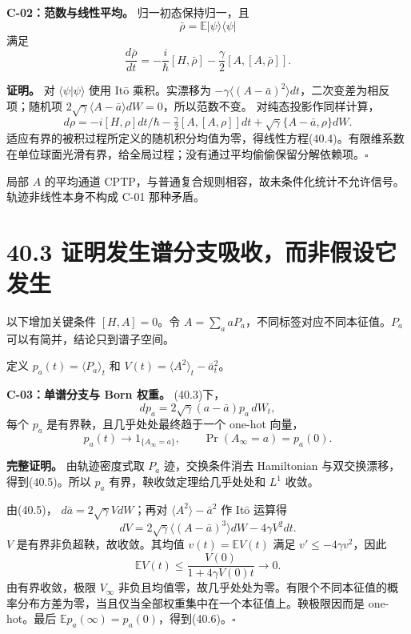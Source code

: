 \documentclass[
  11pt,
  oneside]{book}
\begin{document}
\protect\hypertarget{c-02}{}{}

\textbf{C-02：范数与线性平均。} 归一初态保持归一，且 \[
\bar\rho=\mathbb E|\psi\rangle\langle\psi|
\] 满足 \[
\frac{d\bar\rho}{dt}
=-\frac{i}{\hbar}[H,\bar\rho]
-\frac{\gamma}{2}[A,[A,\bar\rho]].
\tag{40.4}
\]

\textbf{证明。} 对 \(\langle\psi|\psi\rangle\) 使用 Itō 乘积。实漂移为
\(-\gamma\langle(A-\bar a)^2\rangle dt\)，二次变差为相反项；随机项
\(2\sqrt\gamma\langle A-\bar a\rangle dW=0\)，所以范数不变。
对纯态投影作同样计算， \[
d\rho=-i[H,\rho]dt/\hbar-\tfrac\gamma2[A,[A,\rho]]dt
+\sqrt\gamma\{A-\bar a,\rho\}dW.
\]
适应有界的被积过程所定义的随机积分均值为零，得线性方程(40.4)。有限维系数在单位球面光滑有界，给全局过程；没有通过平均偷偷保留分解依赖项。\(\square\)

局部 \(A\) 的平均通道
CPTP，与普通复合规则相容，故未条件化统计不允许信号。轨迹非线性本身不构成
C-01 那种矛盾。

\section{40.3 证明发生谱分支吸收，而非假设它发生}

以下增加关键条件 \([H,A]=0\)。令
\(A=\sum_a aP_a\)，不同标签对应不同本征值。\(P_a\)
可以有简并，结论只到谱子空间。

定义 \(p_a(t)=\langle P_a\rangle_t\) 和
\(V(t)=\langle A^2\rangle_t-\bar a_t^2\)。

\protect\hypertarget{c-03}{}{}

\textbf{C-03：单谱分支与 Born 权重。} (40.3)下， \[
dp_a=2\sqrt\gamma(a-\bar a)p_a\,dW_t,
\tag{40.5}
\] 每个 \(p_a\) 是有界鞅，且几乎处处最终趋于一个 one-hot 向量， \[
p_a(t)\longrightarrow 1_{\{A_\infty=a\}},\qquad
\Pr(A_\infty=a)=p_a(0).
\tag{40.6}
\]

\textbf{完整证明。} 由轨迹密度式取 \(P_a\) 迹，交换条件消去 Hamiltonian
与双交换漂移，得到(40.5)。所以 \(p_a\) 有界，鞅收敛定理给几乎处处和
\(L^1\) 收敛。

由(40.5)， \(d\bar a=2\sqrt\gamma VdW\)；再对
\(\langle A^2\rangle-\bar a^2\) 作 Itō 运算得 \[
dV=2\sqrt\gamma\langle(A-\bar a)^3\rangle dW
-4\gamma V^2dt.
\tag{40.7}
\] \(V\) 是有界非负超鞅，故收敛。其均值 \(v(t)=\mathbb EV(t)\) 满足
\(v'\le-4\gamma v^2\)，因此 \[
\mathbb EV(t)\le\frac{V(0)}{1+4\gamma V(0)t}\longrightarrow0.
\tag{40.8}
\] 由有界收敛，极限 \(V_\infty\)
非负且均值零，故几乎处处为零。有限个不同本征值的概率分布方差为零，当且仅当全部权重集中在一个本征值上。鞅极限因而是
one-hot。最后 \(\mathbb E p_a(\infty)=p_a(0)\)，得到(40.6)。\(\square\)
\end{document}
